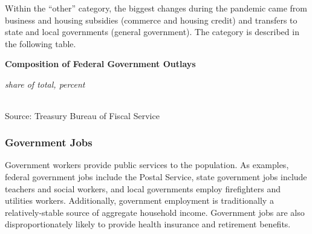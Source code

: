 \documentclass{report}
\begin{document}
{\begin{minipage}{0.76\textwidth}
Within the ``other'' category, the biggest changes during the pandemic came from business and housing subsidies (commerce and housing credit) and transfers to state and local governments (general government). The category is described in the following table. 
\vspace{2mm}

\normalsize \textbf{Composition of Federal Government Outlays}\\
\footnotesize{\textit{share of total, percent}\\
 \setlength{\tabcolsep}{1.2pt} \color{black!90}
{\renewcommand{\arraystretch}{1.55}
\hspace*{-2mm} \begin{tabular}{p{58mm} R{9.0mm} R{9.0mm} R{9.0mm} R{9.0mm} R{9.0mm} R{9.0mm}}
		 \hline
	\end{tabular}
}}
		
\vspace{-2mm}
\footnotesize{Source: Treasury Bureau of Fiscal Service}
\end{minipage}
\newpage
\begin{minipage}{0.76\textwidth}
\subsubsection*{Government Jobs}
\small Government workers provide public services to the population. As examples, federal government jobs include the Postal Service, state government jobs include teachers and social workers, and local governments employ firefighters and utilities workers. Additionally, government employment is traditionally a relatively-stable source of aggregate household income. Government jobs are also disproportionately likely to provide health insurance and retirement benefits.  
\end{minipage}
\vspace{1mm}

}
\end{document}
